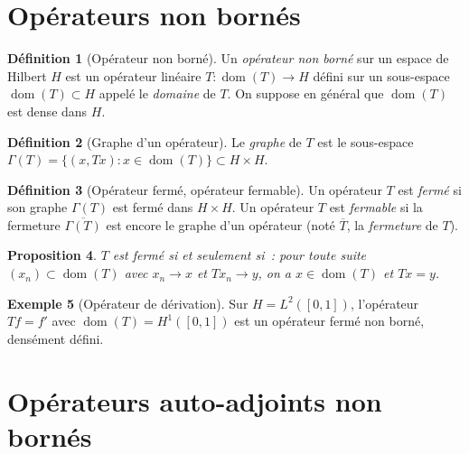 \documentclass[a4paper,12pt]{book}
\DeclareMathOperator{\dom}{dom}
\theoremstyle{definition}
\newtheorem{definition}{Définition}[chapter]
\newtheorem{exemple}[definition]{Exemple}
\theoremstyle{plain}
\newtheorem{proposition}[definition]{Proposition}
\theoremstyle{remark}
\begin{document}
\section{Opérateurs non bornés}

\begin{definition}[Opérateur non borné]
\label{def:op-non-borne}
Un \emph{opérateur non borné} sur un espace de Hilbert $H$ est un opérateur linéaire
$T : \dom(T) \to H$ défini sur un sous-espace $\dom(T) \subset H$ appelé le
\emph{domaine} de $T$. On suppose en général que $\dom(T)$ est dense dans $H$.
\end{definition}

\begin{definition}[Graphe d'un opérateur]
\label{def:graphe}
Le \emph{graphe} de $T$ est le sous-espace
$\Gamma(T) = \{(x, Tx) : x \in \dom(T)\} \subset H \times H$.
\end{definition}

\begin{definition}[Opérateur fermé, opérateur fermable]
\label{def:op-ferme}
Un opérateur $T$ est \emph{fermé} si son graphe $\Gamma(T)$ est fermé dans $H \times H$.
Un opérateur $T$ est \emph{fermable} si la fermeture $\overline{\Gamma(T)}$ est encore le
graphe d'un opérateur (noté $\overline{T}$, la \emph{fermeture} de $T$).
\end{definition}

\begin{proposition}
\label{prop:ferme-equiv}
$T$ est fermé si et seulement si~: pour toute suite $(x_n) \subset \dom(T)$ avec
$x_n \to x$ et $Tx_n \to y$, on a $x \in \dom(T)$ et $Tx = y$.
\end{proposition}

\begin{exemple}[Opérateur de dérivation]
\label{ex:derivation}
Sur $H = L^2([0,1])$, l'opérateur $Tf = f'$ avec $\dom(T) = H^1([0,1])$ est un opérateur
fermé non borné, densément défini.
\end{exemple}

\section{Opérateurs auto-adjoints non bornés}
\end{document}
